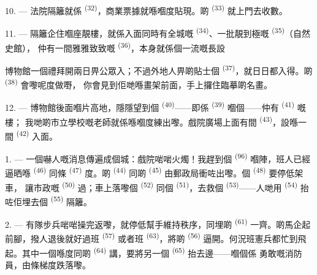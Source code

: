 10. --- 法院隔籬就係 \textsuperscript{(32)}，商業票據就喺嗰度貼現。啲
 \textsuperscript{(33)} 就上門去收數。

\VUsaut{4.0mm}
\VUsaut{3.4mm}

11. --- 隔籬企住嗰座靚樓，就係入面同時有全城嘅
\textsuperscript{(34)}、一批靚到極嘅 \textsuperscript{(35)}（自然史館），
仲有一間雅雅致致嘅 \textsuperscript{(36)}，本身就係個一流嘅長設

博物館一個禮拜開兩日畀公眾入；不過外地人畀啲貼士個
\textsuperscript{(37)}，就日日都入得。啲 \textsuperscript{(38)} 會嚟呢度做嘢，
你會見到佢哋喺畫架前面，手上攞住臨摹啲名畫。

12. --- 博物館後面嗰片高地，隱隱望到個 \textsuperscript{(40)}——即係
 \textsuperscript{(39)} 嗰個——仲有 \textsuperscript{(41)} 嘅樓；
我哋啲市立學校嘅老師就係喺嗰度練出嚟。戲院廣場上面有間
\textsuperscript{(43)}，設喺一間 \textsuperscript{(42)} 入面。

\VUsaut{5.0mm}
\VUsaut{3.0mm}

\VUsaut{3.4mm}

1. --- 一個嚇人嘅消息傳遍成個城：戲院啱啱火燭！我趕到個
\textsuperscript{(96)} 嗰陣，班人已經逼晒喺 \textsuperscript{(46)} 同條
 \textsuperscript{(47)} 度。啲 \textsuperscript{(44)} 同啲
\textsuperscript{(45)} 由郵政局衝咗出嚟。個 \textsuperscript{(48)} 要停低架車，
讓市政嘅 \textsuperscript{(50)} 過；車上落嚟個
\textsuperscript{(52)} 同個 \textsuperscript{(51)}，去救個
\textsuperscript{(53)}——人哋用 \textsuperscript{(54)} 抬咗佢埋去個
\textsuperscript{(55)} 隔籬。

2. --- 有隊步兵啱啱操完返嚟，就停低幫手維持秩序，同埋啲
\textsuperscript{(61)} 一齊。啲馬企起前腳，撥人退後就好過班
\textsuperscript{(57)} 或者班 \textsuperscript{(63)}，將啲
\textsuperscript{(56)} 逼開。何況班憲兵都忙到飛起。其中一個喺度同啲
\textsuperscript{(64)} 講，要將另一個 \textsuperscript{(65)} 抬去邊——嗰個係
勇敢嘅消防員，由條梯度跌落嚟。

